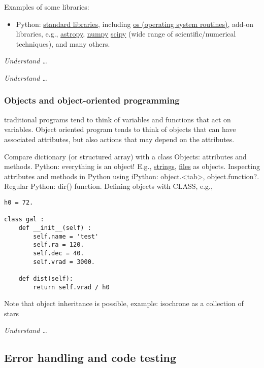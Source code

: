 \documentclass{article}
\newcommand{\test}[1]{%
    \begin{center}
        \colorbox{hl}{\parbox{0.9\textwidth}{\emph{#1}}}
    \end{center}}
\begin{document}
Examples of some libraries:
\begin{itemize}
    \item Python:
        \href{https://docs.python.org/2/library/index.html}
        {standard libraries}, including
        \href{https://docs.python.org/2/library/os.html}
        {os (operating system routines)}, add-on libraries, e.g.,
        \href{http://www.astropy.org}
        {astropy},
        \href{http://www.numpy.org}
        {numpy}
        \href{http://www.scipy.org}
        {scipy} (wide range of scientific/numerical techniques), and
        many others.
\end{itemize}

\test{Understand \ldots}

\test{Understand \ldots}

\subsubsection{Objects and object-oriented programming}

traditional programs tend to think of variables and functions that act
on variables. Object oriented program tends to think of objects that
can have associated attributes, but also actions that may depend on
the attributes.

Compare dictionary (or structured array) with a class
Objects: attributes and methods.
Python:
everything is an object! E.g.,
\href{https://docs.python.org/2/library/stdtypes.html#string-methods}
{strings},
\href{https://docs.python.org/2/tutorial/inputoutput.html#methods-of-file-objects}
{files} as objects.
Inspecting attributes and methods in Python using iPython:
object.<tab>, object.function?. Regular Python: dir() function.
Defining objects with CLASS, e.g.,
\begin{verbatim}
h0 = 72.

class gal :
    def __init__(self) :
        self.name = 'test'
        self.ra = 120.
        self.dec = 40.
        self.vrad = 3000.

    def dist(self):
        return self.vrad / h0
\end{verbatim}
Note that object inheritance is possible, example:
isochrone as a collection of stars

\test{Understand \ldots}

\subsection{Error handling and code testing}
\end{document}
